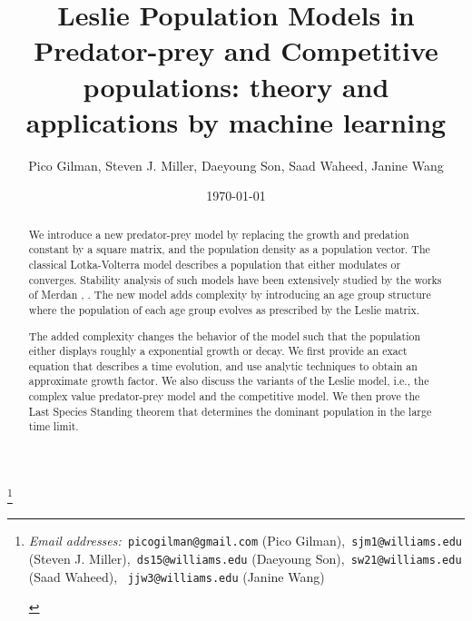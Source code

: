 \documentclass[11pt,reqno]{amsart}
\title{Leslie Population Models in Predator-prey and Competitive populations: theory and applications by machine learning}
\author[Gilman, Miller, Son, Waheed, Wang]{Pico Gilman, Steven J. Miller, Daeyoung Son, Saad Waheed, Janine Wang}
\date{\today}
\numberwithin{equation}{section}
\theoremstyle{plain}
\newcommand\blfootnote[1]{%
  \begingroup
  \renewcommand\thefootnote{}\footnote{#1}%
  \addtocounter{footnote}{-1}%
  \endgroup
}
\begin{document}
\blfootnote{
\begin{center}
\textit{Email addresses:}\texttt{~picogilman@gmail.com} (Pico Gilman),\texttt{~sjm1@williams.edu} (Steven J. Miller),\texttt{~ds15@williams.edu} (Daeyoung Son),\texttt{~sw21@williams.edu} (Saad Waheed), \texttt{~jjw3@williams.edu} (Janine Wang)
\end{center}
}
\maketitle


\begin{abstract}

We introduce a new predator-prey model by replacing the growth and predation constant 
by a square matrix, and the population density as a population vector. The classical 
Lotka-Volterra model describes a population that either modulates or converges. Stability analysis of such models have been extensively studied by the works of Merdan \cite{MeD09}, \cite{Mer10}. The new model adds complexity by introducing an age group structure where the population of each age group evolves as prescribed by the Leslie matrix.

The added complexity changes the behavior of the model such that the population either 
displays roughly a exponential growth or decay. We first provide an exact equation that describes a time evolution, and use analytic techniques to obtain an approximate growth factor. We also discuss the variants of the Leslie model, i.e., the complex value predator-prey model and the competitive model. We then prove the Last Species Standing theorem that determines the dominant population in the large time limit. 


\end{abstract}
\end{document}

